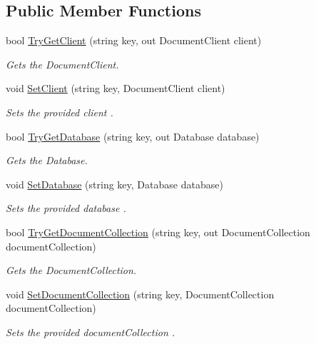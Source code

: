 \subsection*{Public Member Functions}
\begin{DoxyCompactItemize}
\item 
bool \hyperlink{classCqrs_1_1Azure_1_1DocumentDb_1_1GlobalAzureDocumentDbConnectionCache_a5b91ecf67ee594a0a6a4d3193f381c6e_a5b91ecf67ee594a0a6a4d3193f381c6e}{Try\+Get\+Client} (string key, out Document\+Client client)
\begin{DoxyCompactList}\small\item\em Gets the Document\+Client. \end{DoxyCompactList}\item 
void \hyperlink{classCqrs_1_1Azure_1_1DocumentDb_1_1GlobalAzureDocumentDbConnectionCache_a4fbca6dadf7b2d1ffa753d755982820b_a4fbca6dadf7b2d1ffa753d755982820b}{Set\+Client} (string key, Document\+Client client)
\begin{DoxyCompactList}\small\item\em Sets the provided {\itshape client} . \end{DoxyCompactList}\item 
bool \hyperlink{classCqrs_1_1Azure_1_1DocumentDb_1_1GlobalAzureDocumentDbConnectionCache_afa1518eacc7e71308bfe3ef27631da45_afa1518eacc7e71308bfe3ef27631da45}{Try\+Get\+Database} (string key, out Database database)
\begin{DoxyCompactList}\small\item\em Gets the Database. \end{DoxyCompactList}\item 
void \hyperlink{classCqrs_1_1Azure_1_1DocumentDb_1_1GlobalAzureDocumentDbConnectionCache_a1684f60eabfa556929fc264e0192906b_a1684f60eabfa556929fc264e0192906b}{Set\+Database} (string key, Database database)
\begin{DoxyCompactList}\small\item\em Sets the provided {\itshape database} . \end{DoxyCompactList}\item 
bool \hyperlink{classCqrs_1_1Azure_1_1DocumentDb_1_1GlobalAzureDocumentDbConnectionCache_a9b178e41d62c9ebcfd8936418d5de009_a9b178e41d62c9ebcfd8936418d5de009}{Try\+Get\+Document\+Collection} (string key, out Document\+Collection document\+Collection)
\begin{DoxyCompactList}\small\item\em Gets the Document\+Collection. \end{DoxyCompactList}\item 
void \hyperlink{classCqrs_1_1Azure_1_1DocumentDb_1_1GlobalAzureDocumentDbConnectionCache_a19c4bcbf0149036557fb8a3a3b687c79_a19c4bcbf0149036557fb8a3a3b687c79}{Set\+Document\+Collection} (string key, Document\+Collection document\+Collection)
\begin{DoxyCompactList}\small\item\em Sets the provided {\itshape document\+Collection} . \end{DoxyCompactList}\end{DoxyCompactItemize}
